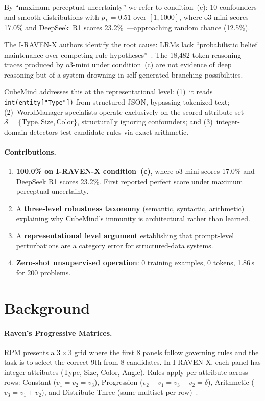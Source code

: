 \documentclass{article}
\begin{document}
By ``maximum perceptual uncertainty'' we refer to condition~(c): 10 confounders and smooth distributions with $p_L = 0.51$ over $[1, 1000]$, where o3-mini scores 17.0\% and DeepSeek~R1 scores 23.2\%~\cite{sicking2026iravenx}---approaching random chance (12.5\%).

The I-RAVEN-X authors identify the root cause: LRMs lack ``probabilistic belief maintenance over competing rule hypotheses''~\cite{sicking2026iravenx}. The 18{,}482-token reasoning traces produced by o3-mini under condition~(c) are not evidence of deep reasoning but of a system drowning in self-generated branching possibilities.

CubeMind addresses this at the representational level: (1)~it reads \texttt{int(entity["Type"])} from structured JSON, bypassing tokenized text; (2)~WorldManager specialists operate exclusively on the scored attribute set $\mathcal{S} = \{\text{Type}, \text{Size}, \text{Color}\}$, structurally ignoring confounders; and (3)~integer-domain detectors test candidate rules via exact arithmetic.

\paragraph{Contributions.}
\begin{enumerate}
    \item \textbf{100.0\% on I-RAVEN-X condition~(c)}, where o3-mini scores 17.0\% and DeepSeek R1 scores 23.2\%. First reported perfect score under maximum perceptual uncertainty.
    \item A \textbf{three-level robustness taxonomy} (semantic, syntactic, arithmetic) explaining why CubeMind's immunity is architectural rather than learned.
    \item A \textbf{representational level argument} establishing that prompt-level perturbations are a category error for structured-data systems.
    \item \textbf{Zero-shot unsupervised operation}: 0 training examples, 0 tokens, 1.86\,s for 200 problems.
\end{enumerate}

\section{Background}

\paragraph{Raven's Progressive Matrices.}
RPM presents a $3 \times 3$ grid where the first 8 panels follow governing rules and the task is to select the correct 9th from 8 candidates. In I-RAVEN-X, each panel has integer attributes (Type, Size, Color, Angle). Rules apply per-attribute across rows: Constant ($v_1{=}v_2{=}v_3$), Progression ($v_2{-}v_1 = v_3{-}v_2 = \delta$), Arithmetic ($v_3 = v_1 \pm v_2$), and Distribute-Three (same multiset per row)~\cite{zhang2019raven}.
\end{document}
